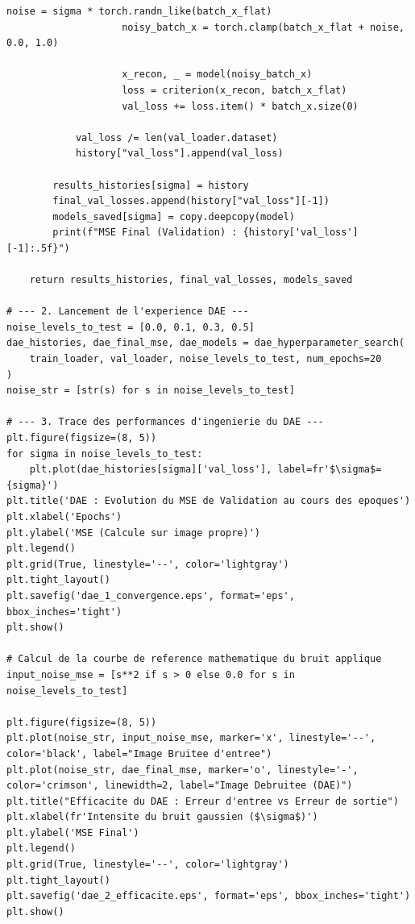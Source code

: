 \documentclass[11pt,a4paper]{report}
\begin{document}
\begin{lstlisting}[caption=Pipeline d'exploration et d'analyse de robustesse du DAE]
                    noise = sigma * torch.randn_like(batch_x_flat)
                    noisy_batch_x = torch.clamp(batch_x_flat + noise, 0.0, 1.0)
                    
                    x_recon, _ = model(noisy_batch_x)
                    loss = criterion(x_recon, batch_x_flat)
                    val_loss += loss.item() * batch_x.size(0)
                    
            val_loss /= len(val_loader.dataset)
            history["val_loss"].append(val_loss)
            
        results_histories[sigma] = history
        final_val_losses.append(history["val_loss"][-1])
        models_saved[sigma] = copy.deepcopy(model)
        print(f"MSE Final (Validation) : {history['val_loss'][-1]:.5f}")
        
    return results_histories, final_val_losses, models_saved

# --- 2. Lancement de l'experience DAE ---
noise_levels_to_test = [0.0, 0.1, 0.3, 0.5]
dae_histories, dae_final_mse, dae_models = dae_hyperparameter_search(
    train_loader, val_loader, noise_levels_to_test, num_epochs=20
)
noise_str = [str(s) for s in noise_levels_to_test]

# --- 3. Trace des performances d'ingenierie du DAE ---
plt.figure(figsize=(8, 5))
for sigma in noise_levels_to_test:
    plt.plot(dae_histories[sigma]['val_loss'], label=fr'$\sigma$={sigma}')
plt.title('DAE : Evolution du MSE de Validation au cours des epoques')
plt.xlabel('Epochs')
plt.ylabel('MSE (Calcule sur image propre)')
plt.legend()
plt.grid(True, linestyle='--', color='lightgray')
plt.tight_layout()
plt.savefig('dae_1_convergence.eps', format='eps', bbox_inches='tight')
plt.show()

# Calcul de la courbe de reference mathematique du bruit applique
input_noise_mse = [s**2 if s > 0 else 0.0 for s in noise_levels_to_test]

plt.figure(figsize=(8, 5))
plt.plot(noise_str, input_noise_mse, marker='x', linestyle='--', color='black', label="Image Bruitee d'entree")
plt.plot(noise_str, dae_final_mse, marker='o', linestyle='-', color='crimson', linewidth=2, label="Image Debruitee (DAE)")
plt.title("Efficacite du DAE : Erreur d'entree vs Erreur de sortie")
plt.xlabel(fr'Intensite du bruit gaussien ($\sigma$)')
plt.ylabel('MSE Final')
plt.legend()
plt.grid(True, linestyle='--', color='lightgray')
plt.tight_layout()
plt.savefig('dae_2_efficacite.eps', format='eps', bbox_inches='tight')
plt.show()


\end{lstlisting}
\end{document}
